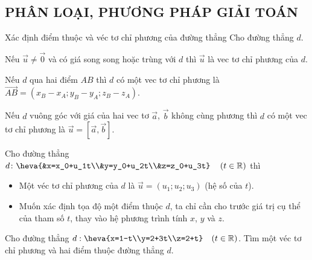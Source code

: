 \subsection{PHÂN LOẠI, PHƯƠNG PHÁP GIẢI TOÁN}
\begin{dang}{Xác định điểm thuộc và véc tơ chỉ phương của đường thẳng}
	Cho đường thẳng $d$.
	\begin{listEX}[1]
		\item [\ding{172}] Nếu $\vec{u} \ne \vec{0}$ và có giá song song hoặc trùng với $d$ thì $\vec{u}$ là vec tơ chỉ phương của $d$.
		\item [\ding{173}] Nếu $d$ qua hai điểm $AB$ thì $d$ có một vec tơ chỉ phương là $\vec{AB}=\left(x_B-x_A; y_B-y_A;z_B-z_A \right)$. 
		\item [\ding{174}] Nếu $d$ vuông góc với giá của hai vec tơ $\vec{a}$, $\vec{b}$ không cùng phương thì $d$ có một vec tơ chỉ phương là $\vec{u}=[\vec{a},\vec{b}]$.
		\item [\ding{175}] Cho đường thẳng  $d \colon \heva{&x=x_0+u_1t\\&y=y_0+u_2t\\&z=z_0+u_3t} \quad \left( t \in \mathbb{R}\right)$ thì
		\begin{itemize}
			\item [$\bullet$] Một véc tơ chỉ phương của $d$ là $\vec{u}=(u_1;u_2;u_3)$ (hệ số của $t$).
			\item [$\bullet$] Muốn xác định tọa độ một điểm thuộc $d$, ta chỉ cần cho trước giá trị cụ thể của tham số $t$, thay vào hệ phương trình tính $x$, $y$ và $z$.
		\end{itemize}
	\end{listEX}
\end{dang}
\setcounter{vd}{0}

\begin{vd}
	Cho đường thẳng $d:\heva{x=1-t\\y=2+3t\\z=2+t}\quad (t\in\mathbb{R})$. Tìm một véc tơ chỉ phương và hai điểm thuộc đường thẳng $d$.
\end{vd}

